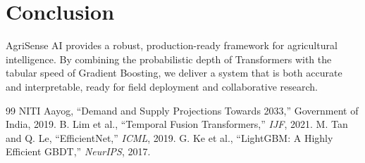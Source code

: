 \documentclass[conference]{IEEEtran}
\begin{document}
\section{Conclusion}
AgriSense AI provides a robust, production-ready framework for agricultural intelligence. By combining the probabilistic depth of Transformers with the tabular speed of Gradient Boosting, we deliver a system that is both accurate and interpretable, ready for field deployment and collaborative research.

\begin{thebibliography}{99}
 NITI Aayog, ``Demand and Supply Projections Towards 2033,'' Government of India, 2019.
 B. Lim et al., ``Temporal Fusion Transformers,'' \textit{IJF}, 2021.
 M. Tan and Q. Le, ``EfficientNet,'' \textit{ICML}, 2019.
 G. Ke et al., ``LightGBM: A Highly Efficient GBDT,'' \textit{NeurIPS}, 2017.
\end{thebibliography}
\end{document}
